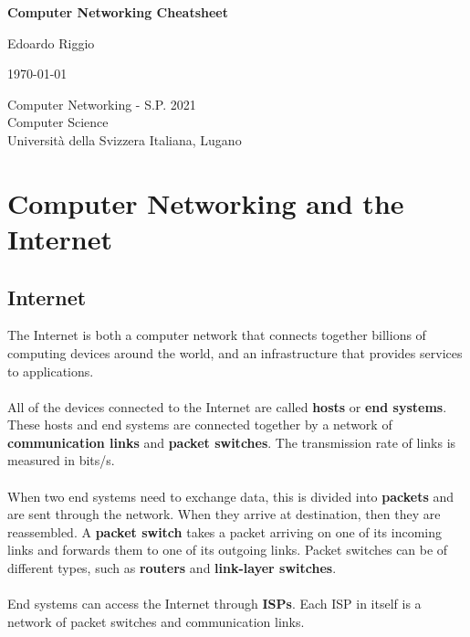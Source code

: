 \documentclass{article}
\begin{document}
\begin{titlepage}
    \begin{center}
        \vspace*{1cm}
        
        \Huge
        \textbf{Computer Networking Cheatsheet}
        
        \vspace{0.5cm}
        \LARGE
        
        \vspace{.5cm}
        
        Edoardo Riggio
   		  \vspace{1.5cm}
       
        \vfill
        
        \today
        
        \vspace{.8cm}
          \Large
          Computer Networking - S.P. 2021 \\
        Computer Science\\
        Universit\`{a} della Svizzera Italiana, Lugano\\
        
    \end{center}
\end{titlepage}

\tableofcontents

\newpage

\section{Computer Networking and the Internet}
\subsection{Internet}
The Internet is both a computer network that connects together billions of computing devices around the world, and an infrastructure that provides services to applications. \\ \\
All of the devices connected to the Internet are called \textbf{hosts} or \textbf{end systems}. These hosts and end systems are connected together by a network of \textbf{communication links} and \textbf{packet switches}. The transmission rate of links is measured in bits/s. \\ \\
When two end systems need to exchange data, this is divided into \textbf{packets} and are sent through the network. When they arrive at destination, then they are reassembled. A \textbf{packet switch} takes a packet arriving on one of its incoming links and forwards them to one of its outgoing links. Packet switches can be of different types, such as \textbf{routers} and \textbf{link-layer switches}. \\ \\
End systems can access the Internet through \textbf{ISPs}. Each ISP in itself is a network of packet switches and communication links.
\end{document}
